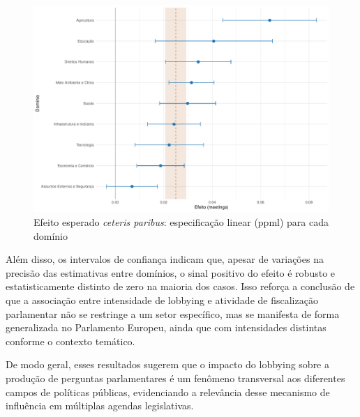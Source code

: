 \begin{figure}[htbp]
\centering
\includegraphics[width=\textwidth]{figures/h1_test/fig_coeff_domains.pdf}
\caption{Efeito esperado \textit{ceteris paribus}: especificação linear (\acrshort{ppml}) para cada domínio}
\label{fig:effect_linear_ppml_domains}
\end{figure}

Além disso, os intervalos de confiança indicam que, apesar de variações na precisão das estimativas entre domínios, o sinal positivo do efeito é robusto e estatisticamente distinto de zero na maioria dos casos. Isso reforça a conclusão de que a associação entre intensidade de lobbying e atividade de fiscalização parlamentar não se restringe a um setor específico, mas se manifesta de forma generalizada no Parlamento Europeu, ainda que com intensidades distintas conforme o contexto temático.

De modo geral, esses resultados sugerem que o impacto do lobbying sobre a produção de perguntas parlamentares é um fenômeno transversal aos diferentes campos de políticas públicas, evidenciando a relevância desse mecanismo de influência em múltiplas agendas legislativas.
